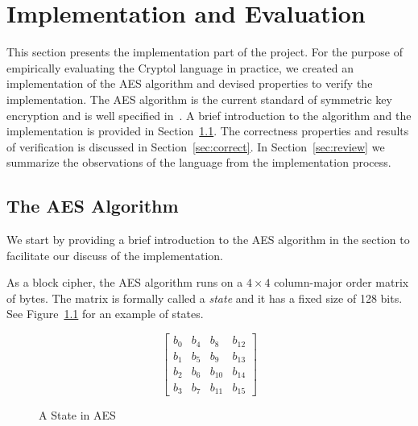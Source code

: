 \documentclass[a4paper, notitlepage]{report}
\begin{document}
\newpage

\chapter{Implementation and Evaluation}
\label{chap:implementation}

This section presents the implementation part of the project. For the purpose of
empirically evaluating the Cryptol language in practice, we created an implementation
of the AES algorithm and devised properties to verify the implementation.
The AES algorithm is the current standard of symmetric key
encryption and is well specified in~\cite{standard2001announcing}. A brief introduction
to the algorithm and the implementation is provided in Section~\ref{sec:aes}.
The correctness properties and results of verification is discussed in
Section~\ref{sec:correct}. In Section~\ref{sec:review} we summarize the observations
of the language from the implementation process. 

\section{The AES Algorithm}
\label{sec:aes}

We start by providing a brief introduction to the AES algorithm in the section
to facilitate our discuss of the implementation.

As a block cipher, the AES
algorithm runs on a $4 \times 4$ column-major order matrix of bytes.
The matrix is formally called a \emph{state} and it has a fixed size of 128 bits.
See Figure~\ref{fig:state} for an example of states.

\begin{figure}
  \begin{center}
    \begin{equation}
      \begin{bmatrix}
        b_0 & b_4 & b_8 & b_{12} \\
        b_1 & b_5 & b_9 & b_{13} \\
        b_2 & b_6 & b_{10} & b_{14} \\
        b_3 & b_7 & b_{11} & b_{15} 
      \end{bmatrix}
    \end{equation}
  \end{center}
  \caption{A State in AES}
  \label{fig:state}
\end{figure}
\end{document}
